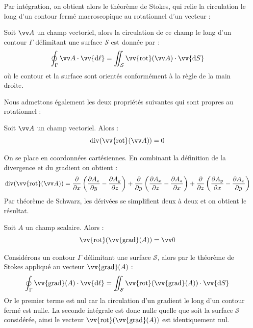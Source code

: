 \documentclass[11pt,fleqn]{book} %
\newcommand{\dd}{\mathrm{d}}
\renewcommand{\div}{\mathrm{div}}
\newcommand{\rot}{\vv{\mathrm{rot}}}
\renewcommand{\grad}{\vv{\mathrm{grad}}}
\begin{document}
Par intégration, on obtient alors le théorème de Stokes, qui relie la circulation le long d'un contour fermé macroscopique au rotationnel d'un vecteur :
\begin{theorem}
	Soit $\vv A$ un champ vectoriel, alors la circulation de ce champ le long d'un contour $\Gamma$ délimitant une surface $\mathcal{S}$ est donnée par :
	\begin{equation}
		\oint_{\Gamma} \vv A \cdot \vv{\dd \ell} = \iint_{\mathcal{S}} \rot(\vv A) \cdot \vv{\dd S}
	\end{equation}
	où le contour et la surface sont orientés conformément à la règle de la main droite.
\end{theorem}

Nous admettons également les deux propriétés suivantes qui sont propres au rotationnel :
\begin{proposition}
	Soit $\vv A$ un champ vectoriel. Alors :
	\begin{equation}
		\div (\rot (\vv A)) = 0
	\end{equation}
\end{proposition}
\begin{demonstration}
	On se place en coordonnées cartésiennes. En combinant la définition de la divergence et du gradient on obtient :
	\begin{equation}
		\div(\rot(\vv A)) = \frac{\partial}{\partial x} \left( \frac{\partial A_z}{\partial y} - \frac{\partial A_y}{\partial z} \right) + \frac{\partial}{\partial y} \left(  \frac{\partial A_x}{\partial z} - \frac{\partial A_z}{\partial x} \right) + \frac{\partial}{\partial z} \left(  \frac{\partial A_y}{\partial x} - \frac{\partial A_x}{\partial y} \right)
	\end{equation}
	Par théorème de Schwarz, les dérivées se simplifient deux à deux et on obtient le résultat.
\end{demonstration}

\begin{proposition}
	Soit $A$ un champ scalaire. Alors :
	\begin{equation}
		\rot(\grad(A)) = \vv 0
	\end{equation}
\end{proposition}
\begin{demonstration}
	Considérons un contour $\Gamma$ délimitant une surface $\mathcal{S}$, alors par le théorème de Stokes appliqué au vecteur $\grad(A)$ :
	\begin{equation}
		\oint_{\Gamma} \grad(A) \cdot \vv{\dd \ell} = \iint_{\mathcal{S}} \rot(\grad(A)) \cdot \vv{\dd S}
	\end{equation}
	Or le premier terme est nul car la circulation d'un gradient le long d'un contour fermé est nulle. La seconde intégrale est donc nulle quelle que soit la surface $\mathcal{S}$ considérée, ainsi le vecteur $\rot(\grad(A))$ est identiquement nul.
\end{demonstration}
\end{document}

